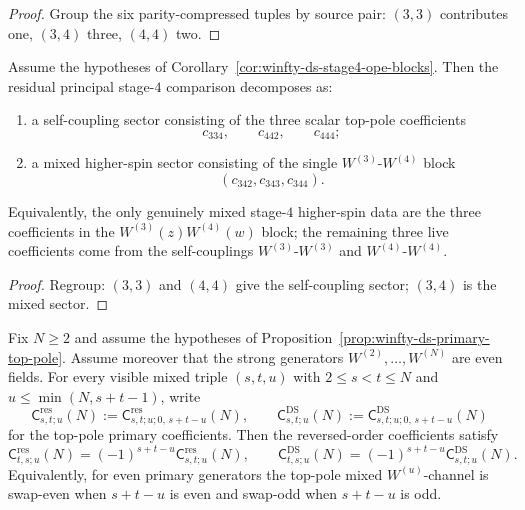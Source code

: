 \begin{proof}
Group the six parity-compressed tuples by source pair: $(3,3)$ contributes one, $(3,4)$ three, $(4,4)$ two.
\end{proof}

\begin{corollary}
\label{cor:winfty-ds-stage4-mixed-self-split}
Assume the hypotheses of
Corollary~\ref{cor:winfty-ds-stage4-ope-blocks}.  Then the residual
principal stage-$4$ comparison decomposes as:
\begin{enumerate}[label=\textup{(\roman*)}]
\item a self-coupling sector consisting of the three scalar top-pole
  coefficients
  \[
  c_{334},\qquad c_{442},\qquad c_{444};
  \]
\item a mixed higher-spin sector consisting of the single
  $W^{(3)}$-$W^{(4)}$ block
  \[
  (c_{342},c_{343},c_{344}).
  \]
\end{enumerate}
Equivalently, the only genuinely mixed stage-$4$ higher-spin data are
the three coefficients in the $W^{(3)}(z)W^{(4)}(w)$ block; the
remaining three live coefficients come from the self-couplings
$W^{(3)}$-$W^{(3)}$ and $W^{(4)}$-$W^{(4)}$.
\end{corollary}

\begin{proof}
Regroup: $(3,3)$ and $(4,4)$ give the self-coupling sector; $(3,4)$ is the mixed sector.
\end{proof}

\begin{proposition}
\label{prop:winfty-ds-mixed-top-pole-swap}
Fix $N \ge 2$ and assume the hypotheses of
Proposition~\ref{prop:winfty-ds-primary-top-pole}.  Assume moreover
that the strong generators $W^{(2)},\dots,W^{(N)}$ are even fields.
For every visible mixed triple $(s,t,u)$ with $2 \le s < t \le N$ and
$u \le \min(N,s+t-1)$, write
\[
\mathsf{C}^{\mathrm{res}}_{s,t;u}(N)
:=
\mathsf{C}^{\mathrm{res}}_{s,t;u;0,\,s+t-u}(N),
\qquad
\mathsf{C}^{\mathrm{DS}}_{s,t;u}(N)
:=
\mathsf{C}^{\mathrm{DS}}_{s,t;u;0,\,s+t-u}(N)
\]
for the top-pole primary coefficients.  Then the reversed-order
coefficients satisfy
\[
\mathsf{C}^{\mathrm{res}}_{t,s;u}(N)
=
(-1)^{s+t-u}\mathsf{C}^{\mathrm{res}}_{s,t;u}(N),
\qquad
\mathsf{C}^{\mathrm{DS}}_{t,s;u}(N)
=
(-1)^{s+t-u}\mathsf{C}^{\mathrm{DS}}_{s,t;u}(N).
\]
Equivalently, for even primary generators the top-pole mixed
$W^{(u)}$-channel is swap-even when $s+t-u$ is even and swap-odd when
$s+t-u$ is odd.
\end{proposition}

